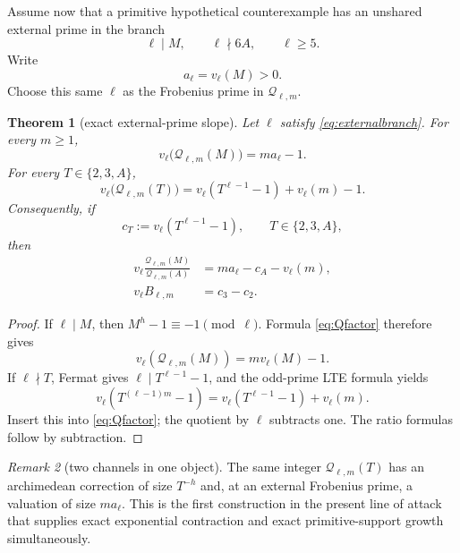 \documentclass[11pt]{article}
\numberwithin{equation}{section}
\newtheorem{theorem}{Theorem}[section]
\theoremstyle{definition}
\theoremstyle{remark}
\newtheorem{remark}[theorem]{Remark}
\begin{document}
Assume now that a primitive hypothetical counterexample has an unshared external prime in the branch
\begin{equation}\label{eq:externalbranch}
  \ell\mid M,
  \qquad \ell\nmid 6A,
  \qquad \ell\ge5.
\end{equation}
Write
\begin{equation}\label{eq:aell}
  a_\ell=v_\ell(M)>0.
\end{equation}
Choose this same $\ell$ as the Frobenius prime in $\mathcal Q_{\ell,m}$.

\begin{theorem}[exact external-prime slope]\label{thm:localslope}
Let $\ell$ satisfy \eqref{eq:externalbranch}.  For every $m\ge1$,
\begin{equation}\label{eq:localM}
  v_\ell\bigl(\mathcal Q_{\ell,m}(M)\bigr)
  =ma_\ell-1.
\end{equation}
For every $T\in\{2,3,A\}$,
\begin{equation}\label{eq:localunit}
  v_\ell\bigl(\mathcal Q_{\ell,m}(T)\bigr)
  =v_\ell(T^{\ell-1}-1)+v_\ell(m)-1.
\end{equation}
Consequently, if
\begin{equation}\label{eq:cT}
  c_T:=v_\ell(T^{\ell-1}-1),
  \qquad T\in\{2,3,A\},
\end{equation}
then
\begin{align}
  v_\ell\frac{\mathcal Q_{\ell,m}(M)}{\mathcal Q_{\ell,m}(A)}
  &=ma_\ell-c_A-v_\ell(m),\label{eq:localoutputratio}\\
  v_\ell B_{\ell,m}
  &=c_3-c_2.\label{eq:localB}
\end{align}
\end{theorem}

\begin{proof}
If $\ell\mid M$, then $M^h-1\equiv-1\pmod\ell$.  Formula \eqref{eq:Qfactor} therefore gives
\[
 v_\ell(\mathcal Q_{\ell,m}(M))
 =m v_\ell(M)-1.
\]
If $\ell\nmid T$, Fermat gives $\ell\mid T^{\ell-1}-1$, and the odd-prime LTE formula yields
\[
  v_\ell(T^{(\ell-1)m}-1)
  =v_\ell(T^{\ell-1}-1)+v_\ell(m).
\]
Insert this into \eqref{eq:Qfactor}; the quotient by $\ell$ subtracts one.  The ratio formulas follow by subtraction.
\end{proof}

\begin{remark}[two channels in one object]
The same integer $\mathcal Q_{\ell,m}(T)$ has an archimedean correction of size $T^{-h}$ and, at an external Frobenius prime, a valuation of size $m a_\ell$.  This is the first construction in the present line of attack that supplies exact exponential contraction and exact primitive-support growth simultaneously.
\end{remark}
\end{document}
